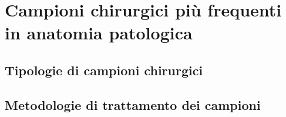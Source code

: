 \chapter{Campioni chirurgici più frequenti in anatomia patologica}

\section{Tipologie di campioni chirurgici}

\section{Metodologie di trattamento dei campioni}
